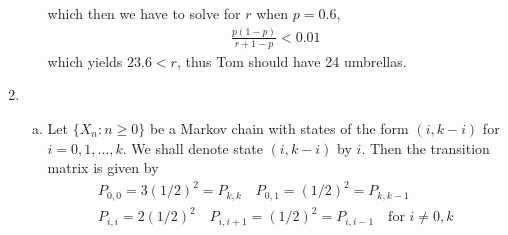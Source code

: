 \documentclass[a4paper,10pt]{article}
\theoremstyle{definition}
\begin{document}
\begin{enumerate}
\begin{enumerate}[(a)]
which then we have to solve for $r$ when $p=0.6$,
\begin{align*}
\frac{p(1-p)}{r+1-p}<0.01
\end{align*}
which yields $23.6<r$, thus Tom should have 24 umbrellas.
\end{enumerate}
\item
\begin{enumerate}[(a)]
\item Let $\{X_n:n\geq0\}$ be a Markov chain with states of the form $(i,k-i)$ for $i=0,1,\ldots, k$. We shall denote state $(i,k-i)$ by $i$. Then the transition matrix is given by
\begin{align*}
P_{0,0}=3(1/2)^2=P_{k,k}\quad P_{0,1}=(1/2)^2=P_{k,k-1}\\
P_{i,i}=2(1/2)^2\quad P_{i,i+1}=(1/2)^2=P_{i,i-1}\quad\text{for $i \neq 0, k$}\\
\end{align*}


\end{enumerate}
\end{enumerate}
\end{document}
